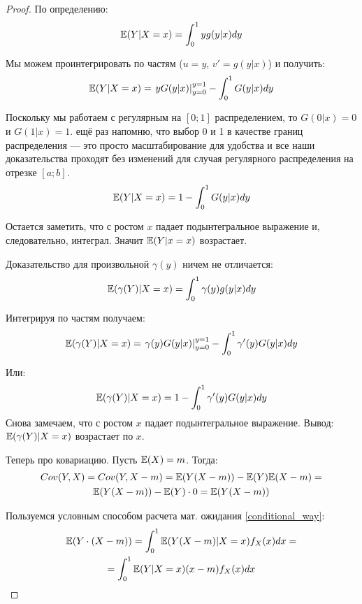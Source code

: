 \begin{proof}
По определению:
\begin{equation}
\mathbb{E}(Y|X=x)=\int_{0}^{1}yg(y|x)dy
\end{equation}

Мы можем проинтегрировать по частям ($ u=y $, $ v'=g(y|x) $) и получить:
\begin{equation}
\mathbb{E}(Y|X=x)=\left.yG(y|x)\right|_{y=0}^{y=1} - \int_{0}^{1}G(y|x)dy
\end{equation}

Поскольку мы работаем с регулярным на $ [0;1] $ распределением, то $ G(0|x)=0 $ и $ G(1|x)=1 $. ещё раз напомню, что выбор 0 и 1 в качестве границ распределения — это просто масштабирование для удобства и все наши доказательства проходят без изменений для случая регулярного распределения на отрезке $ [a;b] $.
\begin{equation}
\mathbb{E}(Y|X=x)=1 - \int_{0}^{1}G(y|x)dy
\end{equation}

Остается заметить, что с ростом $ x $ падает подынтегральное выражение и, следовательно, интеграл. Значит $ \mathbb{E}(Y|x=x) $ возрастает.

Доказательство для произвольной $ \gamma(y) $ ничем не отличается:
\begin{equation}
\mathbb{E}(\gamma(Y)|X=x)=\int_{0}^{1}\gamma(y)g(y|x)dy
\end{equation}

Интегрируя по частям получаем:
\begin{equation}
\mathbb{E}(\gamma(Y)|X=x)=\left.\gamma(y)G(y|x)\right|_{y=0}^{y=1} - \int_{0}^{1}\gamma'(y)G(y|x)dy
\end{equation}

Или:
\begin{equation}
\mathbb{E}(\gamma(Y)|X=x)=1 - \int_{0}^{1}\gamma'(y)G(y|x)dy
\end{equation}
Снова замечаем, что с ростом $ x $ падает подынтегральное выражение. Вывод: $ \mathbb{E}(\gamma(Y)|X=x) $ возрастает по $x$.


Теперь про ковариацию. Пусть $ \mathbb{E}(X)=m $. Тогда:
\begin{multline}
Cov(Y,X)=Cov(Y,X-m)=\mathbb{E}(Y(X-m))-\mathbb{E}(Y)\mathbb{E}(X-m)=\\
\mathbb{E}(Y(X-m))-\mathbb{E}(Y)\cdot 0=\mathbb{E}(Y(X-m))
\end{multline}

Пользуемся условным способом расчета мат. ожидания \ref{conditional_way}:
\begin{multline}
\mathbb{E}(Y\cdot (X-m))=\int_{0}^{1} \mathbb{E}(Y(X-m)|X=x)f_{X}(x)dx=\\
=\int_{0}^{1}\mathbb{E}(Y|X=x)(x-m)f_{X}(x)dx
\end{multline}


\end{proof}
